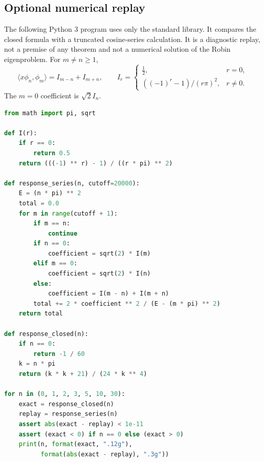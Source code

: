\documentclass[11pt,a4paper]{article}
\theoremstyle{definition}\newtheorem{definition}[theorem]{Definition}
\theoremstyle{remark}\newtheorem{remark}[theorem]{Remark}
\begin{document}
\subsection{Optional numerical replay}
The following Python 3 program uses only the standard library.
It compares the closed formula with a truncated cosine-series
calculation. It is a diagnostic replay, not a premise of any
theorem and not a numerical solution of the Robin eigenproblem.
For $m\ne n\geq1$,
\[
 \langle x\phi_n,\phi_m\rangle=I_{m-n}+I_{m+n},
 \qquad
 I_r=\begin{cases}
       \tfrac12,&r=0,\\
       ((-1)^r-1)/(r\pi)^2,&r\ne0.
      \end{cases}
\]
The $m=0$ coefficient is $\sqrt2 I_n$.

\begin{lstlisting}[language=Python]
from math import pi, sqrt

def I(r):
    if r == 0:
        return 0.5
    return (((-1) ** r) - 1) / ((r * pi) ** 2)

def response_series(n, cutoff=20000):
    E = (n * pi) ** 2
    total = 0.0
    for m in range(cutoff + 1):
        if m == n:
            continue
        if n == 0:
            coefficient = sqrt(2) * I(m)
        elif m == 0:
            coefficient = sqrt(2) * I(n)
        else:
            coefficient = I(m - n) + I(m + n)
        total += 2 * coefficient ** 2 / (E - (m * pi) ** 2)
    return total

def response_closed(n):
    if n == 0:
        return -1 / 60
    k = n * pi
    return (k * k + 21) / (24 * k ** 4)

for n in (0, 1, 2, 3, 5, 10, 30):
    exact = response_closed(n)
    replay = response_series(n)
    assert abs(exact - replay) < 1e-11
    assert (exact < 0) if n == 0 else (exact > 0)
    print(n, format(exact, ".12g"),
          format(abs(exact - replay), ".3g"))
\end{lstlisting}
\end{document}
